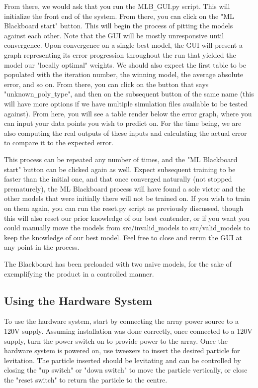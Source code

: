 \documentclass[12pt, titlepage]{article}
\begin{document}
From there, we would ask that you run the MLB\verb|_|GUI.py script. This will initialize the front end of the system. From there, you can click on the "ML Blackboard start" button. This will begin the process of pitting the models against each other. Note that the GUI will be mostly unresponsive until convergence. Upon convergence on a single best model, the GUI will present a graph representing its error progression throughout the run that yielded the model our "locally optimal" weights. We should also expect the first table to be populated with the iteration number, the winning model, the average absolute error, and so on. From there, you can click on the button that says "unknown\verb|_|poly\verb|_|type", and then on the subsequent button of the same name (this will have more options if we have multiple simulation files available to be tested against). From here, you will see a table render below the error graph, where you can input your data points you wish to predict on. For the time being, we are also computing the real outputs of these inputs and calculating the actual error to compare it to the expected error. 

This process can be repeated any number of times, and the "ML Blackboard start" button can be clicked again as well. Expect subsequent training to be faster than the initial one, and that once converged naturally (not stopped prematurely), the ML Blackboard process will have found a sole victor and the other models that were initially there will not be trained on. If you wish to train on them again, you can run the reset.py script as previously discussed, though this will also reset our prior knowledge of our best contender, or if you want you could manually move the models from src/invalid\verb|_|models to src/valid\verb|_|models to keep the knowledge of our best model. Feel free to close and rerun the GUI at any point in the process.

The Blackboard has been preloaded with two naive models, for the sake of exemplifying the product in a controlled manner.


\subsection{Using the Hardware System}
To use the hardware system, start by connecting the array power source to a 120V supply. Assuming installation was done correctly, once connected to a 120V supply, turn the power switch on to provide power to the array. Once the hardware system is powered on, use tweezers to insert the desired particle for levitation. The particle inserted should be levitating and can be controlled by closing the "up switch" or "down switch" to move the particle vertically, or close the "reset switch" to return the particle to the centre. 
\end{document}
